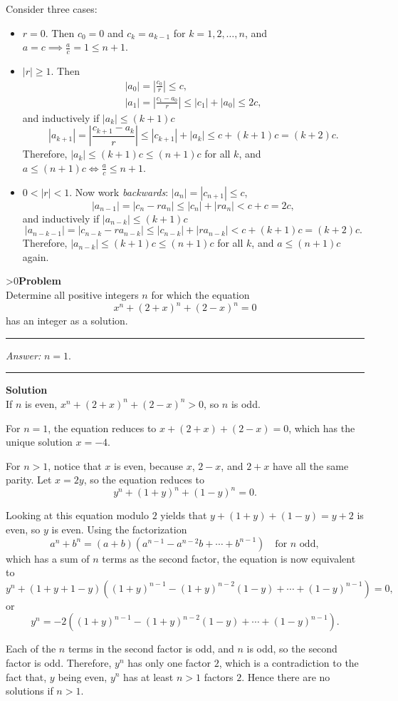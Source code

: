 \documentclass[12pt,oneside,a4paper]{book}
\newcounter{probnum}
\newcounter{solnum}
\newcommand{\prob}{\ifnum\value{probnum}>0\newpage\fi\setcounter{solnum}{0}\stepcounter{probnum}\textbf{Problem \theprobnum}\\}
\newcommand{\ans}{\medskip\hrule\medbreak\emph{Answer: }}
\newcommand{\sol}{\medskip\hrule\medbreak\textbf{Solution}\\}
\begin{document}
Consider three cases:
\begin{itemize}
\item $r=0$. Then $c_0=0$ and $c_k = a_{k-1}$ for $k=1,2,\ldots,n$, and $a=c\implies \frac ac=1\le n+1$.
\item $|r|\ge 1$. Then
\begin{gather*}
|a_0| = \left|\frac{c_0}r\right| \le c,\\
|a_1| = \left|\frac{c_1-a_0}r\right| \le |c_1|+|a_0| \le 2c,
\end{gather*}
and inductively if $|a_k| \le (k+1)c$
\[|a_{k+1}| = \left|\frac{c_{k+1}-a_k}r\right| \le |c_{k+1}| + |a_k| \le c+(k+1)c=(k+2)c.\]
Therefore, $|a_k| \le (k+1)c \le (n+1)c$ for all $k$, and $a \le (n+1)c\iff \frac ac\le n+1$.
\item $0 < |r| < 1$. Now work \emph{backwards}: $|a_n| = |c_{n+1}| \le c$,
\[|a_{n-1}| = |c_n - ra_n| \le |c_n| + |ra_n| < c + c = 2c,\]
and inductively if $|a_{n-k}| \le (k+1)c$
\[|a_{n-k-1}| = |c_{n-k} - ra_{n-k}| \le |c_{n-k}| + |ra_{n-k}| < c + (k+1)c = (k+2)c.\]
Therefore, $|a_{n-k}| \le (k+1)c \le (n+1)c$ for all $k$, and $a\le (n+1)c$ again.
\end{itemize}

\prob Determine all positive integers $n$ for which the equation
\[x^n+(2+x)^n+(2-x)^n=0\]
has an integer as a solution.

\ans $n=1$.

\sol
If $n$ is even, $x^n+(2+x)^n+(2-x)^n > 0$, so $n$ is odd.

For $n=1$, the equation reduces to $x+(2+x)+(2-x)=0$, which has the unique solution $x=-4$.

For $n>1$, notice that $x$ is even, because $x$, $2-x$, and $2+x$ have all the same parity. Let $x=2y$, so the equation reduces to
\[y^n + (1+y)^n + (1-y)^n = 0.\]

Looking at this equation modulo $2$ yields that $y+(1+y)+(1-y)=y+2$ is even, so $y$ is even. Using the factorization
\[a^n + b^n = (a+b)(a^{n-1}-a^{n-2}b+\cdots+b^{n-1})\quad\text{for }n\text{ odd},\]
which has a sum of $n$ terms as the second factor, the equation is now equivalent to
\[y^n + (1+y+1-y)((1+y)^{n-1}-(1+y)^{n-2}(1-y) + \cdots +(1-y)^{n-1}) = 0,\]
or
\[y^n = -2((1+y)^{n-1}-(1+y)^{n-2}(1-y) + \cdots +(1-y)^{n-1}).\]

Each of the $n$ terms in the second factor is odd, and $n$ is odd, so the second factor is odd. Therefore, $y^n$ has only one factor $2$, which is a contradiction to the fact that, $y$ being even, $y^n$ has at least $n>1$ factors $2$. Hence there are no solutions if $n>1$.
\end{document}
